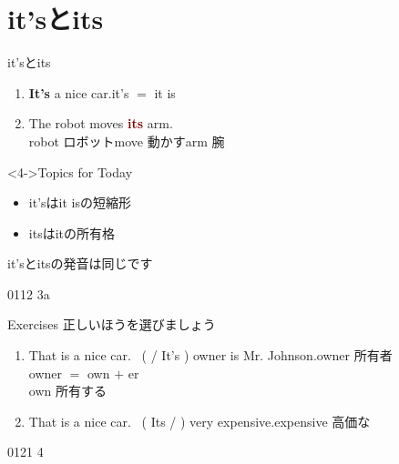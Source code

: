 \documentclass[aspectratio=169,xcolor={dvipsnames,table}]{beamer}
\begin{document}
\section{it'sとits}
\begin{frame}[plain]{it'sとits\hspace{30pt}}
\Large
 \begin{enumerate}
  \item<2-> \textcolor{NavyBlue}{\bfseries It's} a nice car.\hfill{}it's $=$ it is
  \item<3-> The robot moves \textcolor{Maroon}{\bfseries its} arm.\\
\hfill{\scriptsize robot  ロボット\hspace{1\zw}move  動かす\hspace{1\zw}arm  腕}
 \end{enumerate}
\normalsize

\vfill

\begin{block}<4->{Topics for Today}
 \begin{itemize}[square]
  \item {it's}は{it is}の短縮形
  \item itsはitの所有格
 \end{itemize}

\hfill{}it'sとitsの発音は同じです \hspace*{1\zw}
     \end{block}

\hfill{\tiny 0112}\,{\scriptsize {}\,3a}

\end{frame}
\begin{frame}[plain]{Exercises}
 正しいほうを選びましょう

 \begin{enumerate}
  \item That is a nice car.\,\,\,\,\,(  / It's ) owner is Mr. Johnson.\hfill{\scriptsize owner  所有者}\\
\hfill{}{\scriptsize owner $=$ own $+$ er}\\
	\hfill{}{\scriptsize own  所有する}
  \item That is a nice car.\,\,\,\,\,(  Its /  ) very expensive.\hfill{\scriptsize expensive  高価な}
 \end{enumerate}

\vfill

\hfill{\tiny 0121}\,{\scriptsize {}\,4}
\end{frame}
\end{document}
